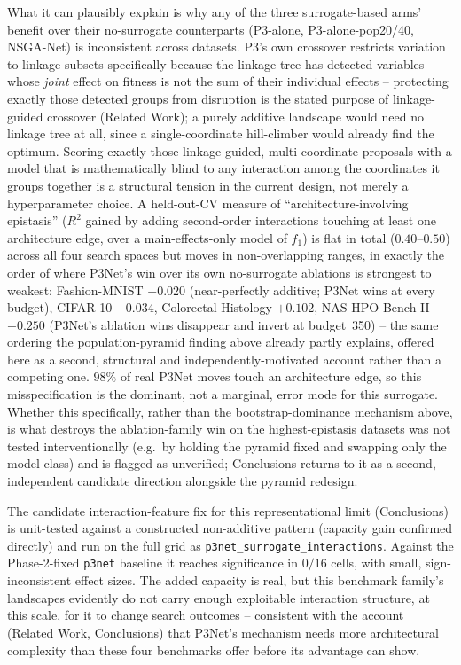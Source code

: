 What it can plausibly explain is why any of the three surrogate-based arms' benefit over their no-surrogate
counterparts (P3-alone, P3-alone-pop20/40, NSGA-Net) is inconsistent across datasets. P3's own crossover
restricts variation to linkage subsets specifically because the linkage tree has detected variables whose
\emph{joint} effect on fitness is not the sum of their individual effects -- protecting exactly those
detected groups from disruption is the stated purpose of linkage-guided crossover (Related Work); a purely
additive landscape would need no linkage tree at all, since a single-coordinate hill-climber would already
find the optimum. Scoring exactly those linkage-guided, multi-coordinate proposals with a model that is
mathematically blind to any interaction among the coordinates it groups together is a structural tension in
the current design, not merely a hyperparameter choice. A held-out-CV measure of ``architecture-involving
epistasis'' ($R^2$ gained by adding second-order interactions touching at least one architecture edge, over
a main-effects-only model of $f_1$) is flat in total ($0.40$--$0.50$) across all four search spaces but moves
in non-overlapping ranges, in exactly the order of where P3Net's win over its own no-surrogate ablations is
strongest to weakest: Fashion-MNIST $-0.020$ (near-perfectly additive; P3Net wins at every budget), CIFAR-10
$+0.034$, Colorectal-Histology $+0.102$, NAS-HPO-Bench-II $+0.250$ (P3Net's ablation wins disappear and
invert at budget~350) -- the same ordering the population-pyramid finding above already partly explains,
offered here as a second, structural and independently-motivated account rather than a competing one. $98\%$
of real P3Net moves touch an architecture edge, so this misspecification is the dominant, not a marginal,
error mode for this surrogate. Whether this specifically, rather than the bootstrap-dominance mechanism
above, is what destroys the ablation-family win on the highest-epistasis datasets was not tested
interventionally (e.g.\ by holding the pyramid fixed and swapping only the model class) and is flagged as
unverified; Conclusions returns to it as a second, independent candidate direction alongside the pyramid
redesign.

The candidate interaction-feature fix for this representational limit (Conclusions) is unit-tested against a
constructed non-additive pattern (capacity gain confirmed directly) and run on the full grid as
\texttt{p3net\_surrogate\_interactions}. Against the Phase-2-fixed \texttt{p3net} baseline it reaches
significance in $0/16$ cells, with small, sign-inconsistent effect sizes. The added capacity is real, but
this benchmark family's landscapes evidently do not carry
enough exploitable interaction structure, at this scale, for it to change search outcomes -- consistent with
the account (Related Work, Conclusions) that P3Net's mechanism needs more architectural complexity than these
four benchmarks offer before its advantage can show.

